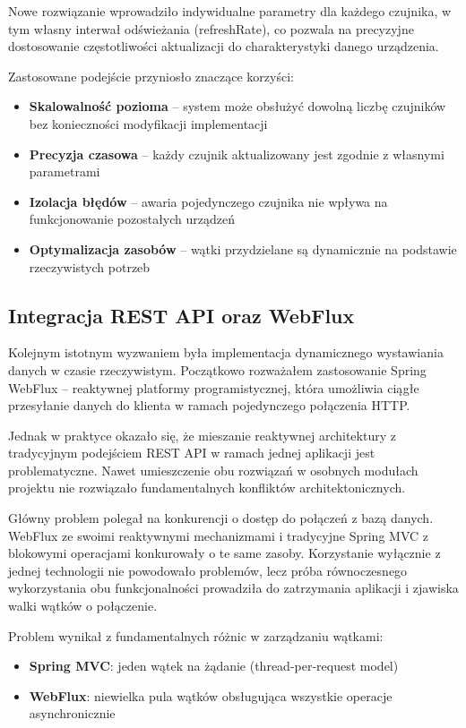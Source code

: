\documentclass[a4paper,12pt,openany]{book}
\begin{document}
Nowe rozwiązanie wprowadziło indywidualne parametry dla każdego czujnika, w tym własny interwał odświeżania (refreshRate), co pozwala na precyzyjne dostosowanie częstotliwości aktualizacji do charakterystyki danego urządzenia.

Zastosowane podejście przyniosło znaczące korzyści:
\begin{itemize}
    \item \textbf{Skalowalność pozioma} -- system może obsłużyć dowolną liczbę czujników bez konieczności modyfikacji implementacji
    \item \textbf{Precyzja czasowa} -- każdy czujnik aktualizowany jest zgodnie z własnymi parametrami
    \item \textbf{Izolacja błędów} -- awaria pojedynczego czujnika nie wpływa na funkcjonowanie pozostałych urządzeń
    \item \textbf{Optymalizacja zasobów} -- wątki przydzielane są dynamicznie na podstawie rzeczywistych potrzeb
\end{itemize}

\subsection*{Integracja REST API oraz WebFlux}

Kolejnym istotnym wyzwaniem była implementacja dynamicznego wystawiania danych w czasie rzeczywistym. Początkowo rozważałem zastosowanie Spring WebFlux -- reaktywnej platformy programistycznej, która umożliwia ciągłe przesyłanie danych do klienta w ramach pojedynczego połączenia HTTP.

Jednak w praktyce okazało się, że mieszanie reaktywnej architektury z tradycyjnym podejściem REST API w ramach jednej aplikacji jest problematyczne. Nawet umieszczenie obu rozwiązań w osobnych modułach projektu nie rozwiązało fundamentalnych konfliktów architektonicznych.

Główny problem polegał na konkurencji o dostęp do połączeń z bazą danych. WebFlux ze swoimi reaktywnymi mechanizmami i tradycyjne Spring MVC z blokowymi operacjami konkurowały o te same zasoby. Korzystanie wyłącznie z jednej technologii nie powodowało problemów, lecz próba równoczesnego wykorzystania obu funkcjonalności prowadziła do zatrzymania aplikacji i zjawiska walki wątków o połączenie.

Problem wynikał z fundamentalnych różnic w zarządzaniu wątkami:
\begin{itemize}
   \item \textbf{Spring MVC}: jeden wątek na żądanie (thread-per-request model)
   \item \textbf{WebFlux}: niewielka pula wątków obsługująca wszystkie operacje asynchronicznie
\end{itemize}
\end{document}
